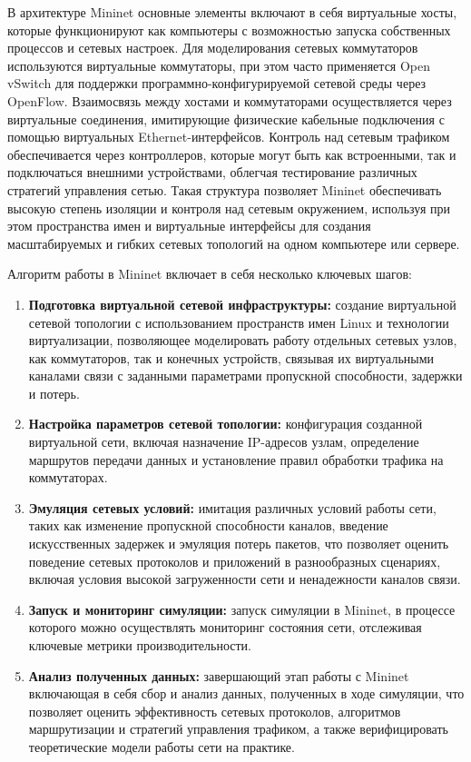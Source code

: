 В архитектуре Mininet основные элементы включают в себя виртуальные хосты, 
которые функционируют как компьютеры с возможностью запуска собственных 
процессов и сетевых настроек. Для моделирования сетевых коммутаторов 
используются виртуальные коммутаторы, при этом часто применяется Open vSwitch для 
поддержки программно-конфигурируемой сетевой среды через OpenFlow. Взаимосвязь между 
хостами и коммутаторами осуществляется через виртуальные соединения, имитирующие физические 
кабельные подключения с помощью виртуальных Ethernet-интерфейсов. Контроль над сетевым трафиком 
обеспечивается через контроллеров, которые могут быть как встроенными, так и подключаться внешними 
устройствами, облегчая тестирование различных стратегий управления сетью. Такая структура позволяет 
Mininet обеспечивать высокую степень изоляции и контроля над сетевым окружением, используя при этом 
пространства имен и виртуальные интерфейсы для создания масштабируемых и гибких сетевых топологий 
на одном компьютере или сервере.

Алгоритм работы в Mininet включает в себя несколько ключевых шагов:
\begin{enumerate}
\item \textbf{Подготовка виртуальной сетевой инфраструктуры:} создание виртуальной сетевой топологии с использованием пространств имен Linux и технологии виртуализации, позволяющее моделировать работу отдельных сетевых узлов, как коммутаторов, так и конечных устройств, связывая их виртуальными каналами связи с заданными параметрами пропускной способности, задержки и потерь.
\item \textbf{Настройка параметров сетевой топологии:} конфигурация созданной виртуальной сети, включая назначение IP-адресов узлам, определение маршрутов передачи данных и установление правил обработки трафика на коммутаторах.
\item \textbf{Эмуляция сетевых условий:} имитация различных условий работы сети, таких как изменение пропускной способности каналов, введение искусственных задержек и эмуляция потерь пакетов, что позволяет оценить поведение сетевых протоколов и приложений в разнообразных сценариях, включая условия высокой загруженности сети и ненадежности каналов связи.
\item \textbf{Запуск и мониторинг симуляции:} запуск симуляции в Mininet, в процессе которого можно осуществлять мониторинг состояния сети, отслеживая ключевые метрики производительности.
\item \textbf{Анализ полученных данных:} завершающий этап работы с Mininet включающая в себя сбор и анализ данных, полученных в ходе симуляции, что позволяет оценить эффективность сетевых протоколов, алгоритмов маршрутизации и стратегий управления трафиком, а также верифицировать теоретические модели работы сети на практике.
\end{enumerate}

